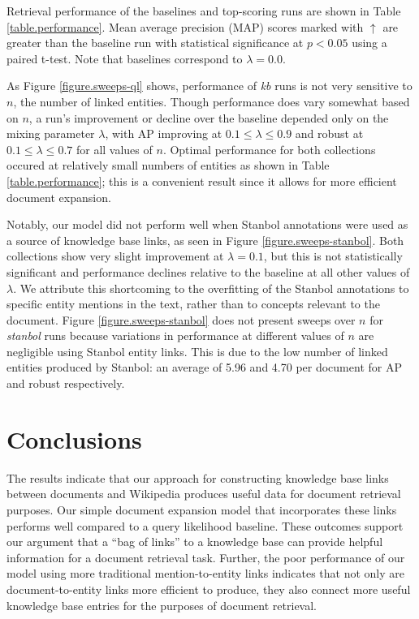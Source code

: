 \documentclass{sig-alternate}
\begin{document}
Retrieval performance of the baselines and top-scoring runs are shown in Table \ref{table.performance}. Mean average precision (MAP) scores marked with $\uparrow$ are greater than the baseline run with statistical significance at $p < 0.05$ using a paired t-test. Note that baselines correspond to $\lambda = 0.0$. 

As Figure \ref{figure.sweeps-ql} shows, performance of \textit{kb} runs is not very sensitive to $n$, the number of linked entities. Though performance does vary somewhat based on $n$, a run's improvement or decline over the baseline depended only on the mixing parameter $\lambda$, with AP improving at $0.1 \leq \lambda \leq 0.9$ and robust at $0.1 \leq \lambda \leq 0.7$ for all values of $n$. Optimal performance for both collections occured at relatively small numbers of entities as shown in Table \ref{table.performance}; this is a convenient result since it allows for more efficient document expansion.

Notably, our model did not perform well when Stanbol annotations were used as a source of knowledge base links, as seen in Figure \ref{figure.sweeps-stanbol}. Both collections show very slight improvement at $\lambda = 0.1$, but this is not statistically significant and performance declines relative to the baseline at all other values of $\lambda$. We attribute this shortcoming to the overfitting of the Stanbol annotations to specific entity mentions in the text, rather than to concepts relevant to the document. Figure \ref{figure.sweeps-stanbol} does not present sweeps over $n$ for \textit{stanbol} runs because variations in performance at different values of $n$ are negligible using Stanbol entity links. This is due to the low number of linked entities produced by Stanbol: an average of 5.96 and 4.70 per document for AP and robust respectively.

\section{Conclusions}\label{section.conclusions}

The results indicate that our approach for constructing knowledge base links between documents and Wikipedia produces useful data for document retrieval purposes. Our simple document expansion model that incorporates these links performs well compared to a query likelihood baseline. These outcomes support our argument that a ``bag of links'' to a knowledge base can provide helpful information for a document retrieval task. Further, the poor performance of our model using more traditional mention-to-entity links indicates that not only are document-to-entity links more efficient to produce, they also connect more useful knowledge base entries for the purposes of document retrieval.
\end{document}
